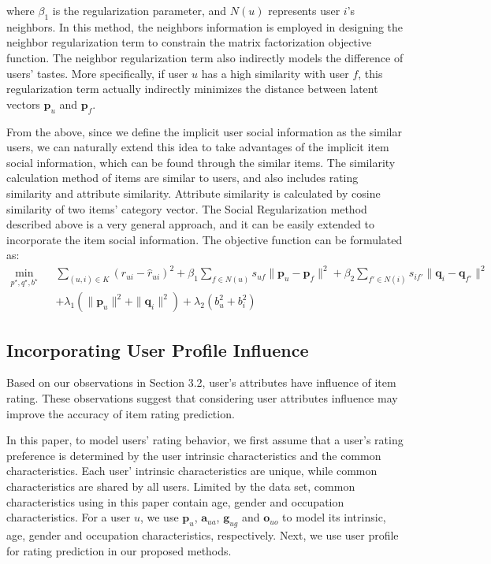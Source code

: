 \documentclass{llncs}
\begin{document}
\noindent where $\beta_1$ is the regularization parameter,
	and $N(u)$ represents user $i$'s neighbors.
	In this method, the neighbors information is employed in designing the neighbor regularization term to constrain the matrix factorization objective function. The neighbor regularization term also indirectly models the difference
	of users' tastes. More specifically, if user $u$ has a high similarity with  user
	$f$, this regularization term actually indirectly minimizes the distance between latent vectors $\mathbf{p}_u$ and
	$\mathbf{p}_f$.
	
	From the above, since we define the implicit user social information as the similar users, we can naturally
	extend this idea to take advantages of the implicit item
	social information, which can be found through the similar items.
    The similarity calculation method of items are similar to users, and also includes rating similarity and
    attribute similarity. Attribute similarity is calculated by cosine similarity of two items' category vector.
	The Social Regularization method described above
	is a very general approach, and it can be easily extended
	to incorporate the item social information. The objective
	function can be formulated as:
	\begin{eqnarray*}
		\min_{p^\star,q^\star,b^\star} &&\sum_{(u,i)\in K} {(r_{ui}-\hat{r}_{ui})^2}+
		\beta_1\sum_{f \in N(u)}s_{uf}\parallel{\mathbf{p}_u-\mathbf{p}_f}\parallel^2
		+\beta_2\sum_{f'\in N(i)}s_{if'}\parallel{\mathbf{q}_i-\mathbf{q}_{f'}}\parallel^2 \\
		&&+\lambda_1(\parallel{\mathbf{p}_u}\parallel^2+\parallel{\mathbf{q}_i}\parallel^2)+\lambda_2(b_u^2+b_i^2)
	\end{eqnarray*}
	
\subsection{Incorporating User Profile Influence}
	Based on our observations in Section 3.2, user's attributes have  influence of item rating.
	These observations suggest that considering user attributes influence may improve the
	accuracy of item rating prediction.
	
	In this paper, to model users' rating behavior, we
	first assume that a user's rating preference is determined
	by the user intrinsic characteristics and the common characteristics. Each user' intrinsic characteristics are unique,
	while common characteristics are shared by all users.
	Limited by the data set, common characteristics using in this paper contain age, gender and occupation characteristics.
	For a user $u$, we use $\mathbf{p}_u$, $\mathbf{a}_{ua}$, $\mathbf{g}_{ug}$ and $\mathbf{o}_{uo}$ to model its intrinsic, age, gender and occupation characteristics, respectively.
	Next, we use user profile for rating prediction in our proposed methods.
\end{document}
